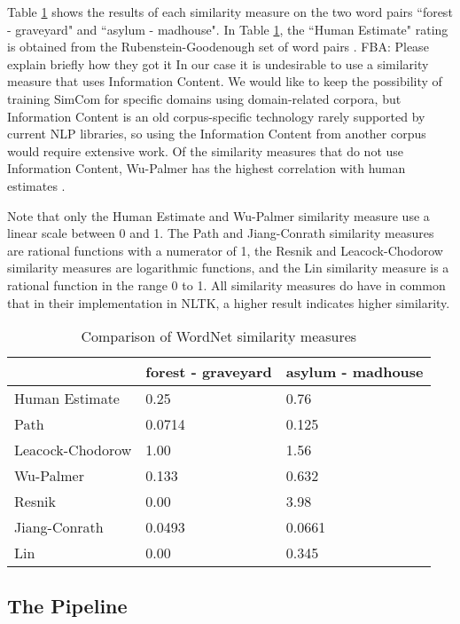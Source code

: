 \documentclass{article}
\newcommand\fba[1]{\textcolor{SeaGreen3}{FBA: #1}}
\begin{document}
Table \ref{table:wordnetsimilarity} shows the results of each similarity measure on the two word pairs ``forest - graveyard" and ``asylum - madhouse". In Table \ref{table:wordnetsimilarity}, the ``Human Estimate" rating is obtained from the Rubenstein-Goodenough set of word pairs \cite{rubenstein1965contextual}. \fba{Please explain briefly how they got it} In our case it is undesirable to use a similarity measure that uses Information Content. We would like to keep the possibility of training SimCom for specific domains using domain-related corpora, but Information Content is an old corpus-specific technology rarely supported by current NLP libraries, so using the Information Content from another corpus would require extensive work. Of the similarity measures that do not use Information Content, Wu-Palmer has the highest correlation with human estimates \citep{budanitsky2006evaluating,seco2004intrinsic,mihalcea2006corpus}. %

Note that only the Human Estimate and Wu-Palmer similarity measure use a linear scale between 0 and 1. The Path and Jiang-Conrath similarity measures are rational functions with a numerator of 1, the Resnik and Leacock-Chodorow similarity measures are logarithmic functions, and the Lin similarity measure is a rational function in the range 0 to 1. All similarity measures do have in common that in their implementation in NLTK, a higher result indicates higher similarity.

\begin{table}[h!]
\caption{Comparison of WordNet similarity measures} %
\centering
\begin{tabular}{lll}
	\toprule
	& forest - graveyard & asylum - madhouse \\
	\midrule
	Human Estimate & 0.25 & 0.76 \\
	Path & 0.0714 & 0.125 \\
	Leacock-Chodorow & 1.00 & 1.56 \\
	Wu-Palmer & 0.133 & 0.632 \\
	Resnik & 0.00 & 3.98 \\
	Jiang-Conrath & 0.0493 & 0.0661 \\
	Lin & 0.00 & 0.345 \\
	\bottomrule
\end{tabular}
\label{table:wordnetsimilarity}
\end{table}

\subsection{The Pipeline}
\end{document}
